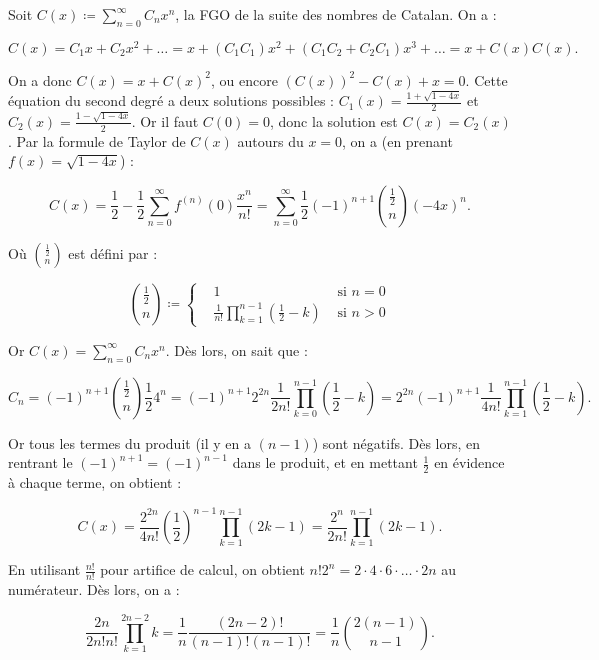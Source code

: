 \documentclass{article}
\begin{document}
			Soit $C(x) \coloneqq \sum_{n=0}^\infty C_n x^n$, la FGO de la suite des nombres de Catalan. On a :

			\[C(x) = C_1x + C_2x^2 + \ldots = x + (C_1C_1)x^2 + (C_1C_2 + C_2C_1)x^3 + \ldots = x + C(x)C(x).\]

			On a donc $C(x) = x + C(x)^2$, ou encore $(C(x))^2 - C(x) + x = 0$. Cette équation du second degré a deux solutions possibles :
			$C_1(x) = \frac {1+\sqrt {1-4x}}2$ et $C_2(x) = \frac {1-\sqrt {1-4x}}2$. Or il faut $C(0) = 0$, donc la solution est $C(x) = C_2(x)$.
			Par la formule de Taylor de $C(x)$ autours du $x=0$, on a (en prenant $f(x) = \sqrt {1-4x}$) :

			\[C(x) = \frac 12 - \frac 12\sum_{n=0}^\infty f^{(n)}(0)\frac {x^n}{n!} = \sum_{n=0}^\infty \frac 12(-1)^{n+1}\binom {\frac 12}n(-4x)^n.\]

			Où $\binom {\frac 12}n$ est défini par :

			\[\binom {\frac 12}n \coloneqq \left\{\begin{aligned}&1 &\text{ si } n=0\\&\frac 1{n!}\prod_{k=1}^{n-1}\left(\frac 12-k\right) &\text{ si } n > 0\end{aligned}\right.\]

			Or $C(x) = \sum_{n=0}^\infty C_nx^n$. Dès lors, on sait que :

			\[C_n = (-1)^{n+1}\binom {\frac 12}n\frac 124^n = (-1)^{n+1} 2^{2n}\frac 1{2n!}\prod_{k=0}^{n-1}\left(\frac 12 - k\right) = 2^{2n}(-1)^{n+1}\frac 1{4n!}\prod_{k=1}^{n-1}\left(\frac 12-k\right).\]

			Or tous les termes du produit (il y en a $(n-1)$) sont négatifs. Dès lors, en rentrant le $(-1)^{n+1} = (-1)^{n-1}$ dans le produit, et en mettant $\frac 12$
			en évidence à chaque terme, on obtient :

			\[C(x) = \frac {2^{2n}}{4n!}\left(\frac 12\right)^{n-1}\prod_{k=1}^{n-1}(2k-1) = \frac {2^n}{2n!}\prod_{k=1}^{n-1}(2k-1).\]

			En utilisant $\frac {n!}{n!}$ pour artifice de calcul, on obtient $n!2^n = 2\cdot4\cdot6\cdot\ldots\cdot2n$ au numérateur. Dès lors, on a :
			
			\[\frac {2n}{2n!n!}\prod_{k=1}^{2n-2}k = \frac 1{n}\frac {(2n-2)!}{(n-1)!(n-1)!} = \frac 1n\binom {2(n-1)}{n-1}.\]
\end{document}
